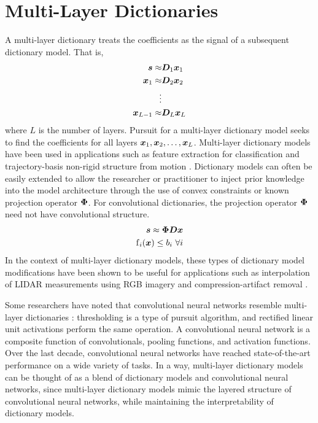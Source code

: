 \section{Multi-Layer Dictionaries}
A multi-layer dictionary treats the coefficients as the signal of a subsequent dictionary model. That is,
\begin{equation}
\begin{split}
\bm{s} \approx & \bm{D}_1\bm{x}_1
\\
\bm{x}_1 \approx & \bm{D}_2\bm{x}_2
\\
\vdots & 
\\
\bm{x}_{L - 1} \approx & \bm{D}_L\bm{x}_L
\end{split}
\end{equation}
where $L$ is the number of layers. Pursuit for a multi-layer dictionary model seeks to find the coefficients for all layers $\bm{x}_1,\bm{x}_2,\hdots,\bm{x}_L$. Multi-layer dictionary models have been used in applications such as feature extraction for classification \cite{chen2013deep}\cite{zeiler2010deconvolutional}\cite{pu2014bayesian} and trajectory-basis non-rigid structure from motion \cite{chodosh2020use}. Dictionary models can often be easily extended to allow the researcher or practitioner to inject prior knowledge into the model architecture through the use of convex constraints or known projection operator $\bm{\Phi}$. For convolutional dictionaries, the projection operator $\bm{\Phi}$ need not have convolutional structure.
%
\begin{equation}
\begin{split}
\bm{s} \approx \bm{\Phi}\bm{D}\bm{x}
\\
\operatorname{f}_i(\bm{x}) \leq b_i \text{ } \forall i
\end{split}
\end{equation}
%
In the context of multi-layer dictionary models, these types of dictionary model modifications have been shown to be useful for applications such as interpolation of LIDAR measurements using RGB imagery \cite{murdock2018deep}\cite{chodosh2018deep} and compression-artifact removal \cite{chodosh2020use}.

Some researchers have noted that convolutional neural networks resemble multi-layer dictionaries \cite{papyan2017convolutional}: thresholding is a type of pursuit algorithm, and rectified linear unit activations perform the same operation. A convolutional neural network is a composite function of convolutionals, pooling functions, and activation functions. Over the last decade, convolutional neural networks have reached state-of-the-art performance on a wide variety of tasks. In a way, multi-layer dictionary models can be thought of as a blend of dictionary models and convolutional neural networks, since multi-layer dictionary models mimic the layered structure of convolutional neural networks, while maintaining the interpretability of dictionary models.


